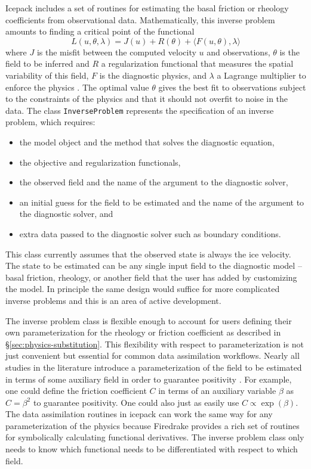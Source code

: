 \documentclass[journal abbreviation, manuscript]{copernicus}
\begin{document}
Icepack includes a set of routines for estimating the basal friction or rheology coefficients from observational data.
Mathematically, this inverse problem amounts to finding a critical point of the functional
\begin{equation}
    L(u, \theta, \lambda) = J(u) + R(\theta) + \langle F(u, \theta), \lambda\rangle
\end{equation}
where $J$ is the misfit between the computed velocity $u$ and observations, $\theta$ is the field to be inferred and $R$ a regularization functional that measures the spatial variability of this field, $F$ is the diagnostic physics, and $\lambda$ a Lagrange multiplier to enforce the physics \citep{macayeal1992basal, joughin2004basal, larour2005rheology, shapero2016basal}.
The optimal value $\theta$ gives the best fit to observations subject to the constraints of the physics and that it should not overfit to noise in the data.
The class \texttt{InverseProblem} represents the specification of an inverse problem, which requires:
\begin{itemize}
    \item the model object and the method that solves the diagnostic equation,
    \item the objective and regularization functionals,
    \item the observed field and the name of the argument to the diagnostic solver,
    \item an initial guess for the field to be estimated and the name of the argument to the diagnostic solver, and
    \item extra data passed to the diagnostic solver such as boundary conditions.
\end{itemize}
This class currently assumes that the observed state is always the ice velocity.
The state to be estimated can be any single input field to the diagnostic model -- basal friction, rheology, or another field that the user has added by customizing the model.
In principle the same design would suffice for more complicated inverse problems and this is an area of active development.

The inverse problem class is flexible enough to account for users defining their own parameterization for the rheology or friction coefficient as described in \S\ref{sec:physics-substitution}.
This flexibility with respect to parameterization is not just convenient but essential for common data assimilation workflows.
Nearly all studies in the literature introduce a parameterization of the field to be estimated in terms of some auxiliary field in order to guarantee positivity \citep{macayeal1992basal, joughin2009basal}.
For example, one could define the friction coefficient $C$ in terms of an auxiliary variable $\beta$ as $C = \beta^2$ to guarantee positivity.
One could also just as easily use $C \propto \exp(\beta)$.
The data assimilation routines in icepack can work the same way for any parameterization of the physics because Firedrake provides a rich set of routines for symbolically calculating functional derivatives.
The inverse problem class only needs to know which functional needs to be differentiated with respect to which field.
\end{document}
